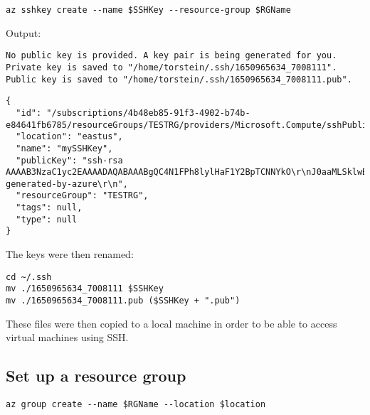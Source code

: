 \begin{verbatim}
az sshkey create --name $SSHKey --resource-group $RGName
\end{verbatim}

Output:

\begin{verbatim}
No public key is provided. A key pair is being generated for you.
Private key is saved to "/home/torstein/.ssh/1650965634_7008111".
Public key is saved to "/home/torstein/.ssh/1650965634_7008111.pub".
\end{verbatim}

\begin{verbatim}
{
  "id": "/subscriptions/4b48eb85-91f3-4902-b74b-e84641fb6785/resourceGroups/TESTRG/providers/Microsoft.Compute/sshPublicKeys/mySSHKey",
  "location": "eastus",
  "name": "mySSHKey",
  "publicKey": "ssh-rsa AAAAB3NzaC1yc2EAAAADAQABAAABgQC4N1FPh8lylHaF1Y2BpTCNNYkO\r\nJ0aaMLSklwBzdA4MrLY0vqnIhJY1QzB7NC3tOxOAqEZVQjqiOiFQRZu0ifV91odi\r\njwuEOWCWia8Wix0AKpxPlFIcUbWE4auf6KOSAAuoTCuXp3H29H+tGtuy/l1ZjBJb\r\nazxFz32j9uwEjVLtkYiYtSPxtnhuTnN6l5wkI36mxni6dQsTKQNTck4bmkU+BmSI\r\nQ4k5YXfhxV0UTqYL5WeVzVDTJnBrDFu8fClio/kcbhCn+w6B2yWfNFuvLmOlpIA6\r\nVZm4MaWpD9mp25J9YDcJ/Y5MewuNW7QqVNQDKfTrWXKz+blkKQ9DVzXvF63myNtQ\r\niMJdzLTvAbgTL0zXPw111r5x8KKHW0nCehWtKvHk2xh2sOcdSVSDu4uZN6eacAPC\r\n4Ii3rJ3QgjL1IxRTITBJ/oZAFxxFZCtPbPYF9pD2iURzibAvLkp5BhLwk954So8G\r\nMzRvVUnM7gtaVNL4UxCYHMbvibwkXaNtu2ZWjGU= generated-by-azure\r\n",
  "resourceGroup": "TESTRG",
  "tags": null,
  "type": null
}
\end{verbatim}

The keys were then renamed:
\begin{verbatim}
cd ~/.ssh
mv ./1650965634_7008111 $SSHKey
mv ./1650965634_7008111.pub ($SSHKey + ".pub")
\end{verbatim}

These files were then copied to a local machine
in order to be able to access virtual machines using SSH.
\subsection{Set up a resource group}
\label{sec:org880946b}
\begin{verbatim}
az group create --name $RGName --location $location
\end{verbatim}

